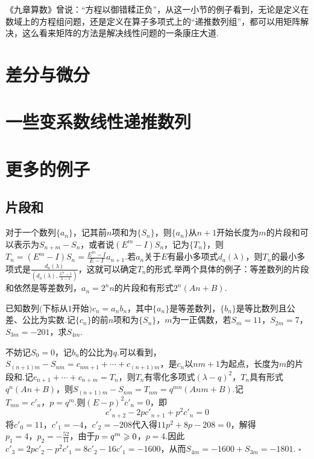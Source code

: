 \documentclass[10pt]{article}
\newcommand*{\QEDB}{\hfill\ensuremath{\square}}  %
\newcommand*{\D}{\text{，}}
\numberwithin{equation}{section}
\begin{document}
\par 《九章算数》曾说：“方程以御错糅正负”，从这一小节的例子看到，无论是定义在数域上的方程组问题，还是定义在算子多项式上的“递推数列组”，都可以用矩阵解决，这么看来矩阵的方法是解决线性问题的一条康庄大道.
\section{差分与微分}
\section{一些变系数线性递推数列}
\section{更多的例子}
\subsection{片段和}
对于一个数列$\{a_n\}$，记其前$n$项和为$\{S_n\}$，则$\{a_n\}$从$n+1$开始长度为$m$的片段和可以表示为$S_{n+m}-S_{n}$，或者说$(E^m-I)S_n$，记为$\{T_n\}$，则$T_n = (E^m-I)S_{n} = \frac{E^m-I}{E-I}a_{n+1}$.若$a_n$关于$E$有最小多项式$d_a(\lambda)$，则$T_n$的最小多项式是$\frac{d_a(\lambda)}{\left(d_a(\lambda),\frac{\lambda^m-1}{\lambda-1}\right)}$，这就可以确定$T_n$的形式.举两个具体的例子：等差数列的片段和依然是等差数列，$a_n = 2^nn$的片段和有形式$2^n(An+B)$.
\begin{LT}
    已知数列$($下标从$1$开始$)$$c_n = a_nb_n$，其中$\{a_n\}$是等差数列，$\{b_n\}$是等比数列且公差、公比为实数.记$\{c_n\}$的前$n$项和为$\{S_n\}$，$m$为一正偶数，若$S_m = 11$，$S_{2m} = 7$，$S_{3m} = -201$，求$S_{4m}$.
\end{LT}
\begin{JT}
    不妨记$S_0 = 0$，记$b_n$的公比为$q$.可以看到，$S_{(n+1)m}-S_{nm} = c_{nm+1}+\cdots+c_{(n+1)m}$，是$c_n$以$nm+1$为起点，长度为$m$的片段和.记$c_{n+1} + \cdots + c_{n+m} = T_n$，则$T_n$有零化多项式$(\lambda-q)^2$，$T_n$具有形式$q^n(An+B)$，则$S_{(n+1)m} - S_{nm} = T_{nm} = q^{mn}(Anm+B)$.记$T_{nm} = c'_n\D p = q^m$.则$(E-p)^2c'_n = 0$，即
    $$c'_{n+2} - 2p c'_{n+1} + p^2c'_n = 0$$
    将$c'_{0} = 11\D c'_1 = -4\D c'_2 = -208$代入得$11p^2+8p-208 = 0$，解得$p_1 = 4\D p_2 = -\frac{52}{11}$，由于$p = q^m \geqslant 0$，$p = 4$.因此$c'_3 = 2pc'_2-p^2c'_1 = 8c'_2-16c'_1=-1600$，从而$S_{4m} = -1600+S_{3m} = -1801$. \QEDB
\end{JT}
\end{document}
